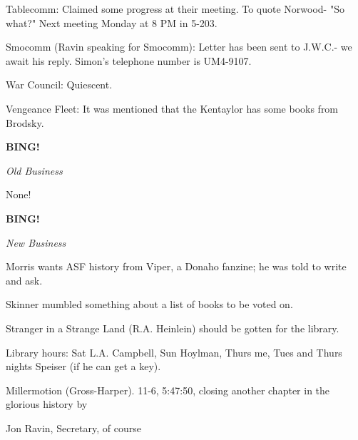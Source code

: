 \documentclass[12pt]{article}
\newcommand{\bing}{{\bf BING!} }
\newcommand{\goto}[1]{\bing \vskip 12pt \centerline{{\em{#1}}}}
\begin{document}
Tablecomm: Claimed some progress at their meeting. To quote Norwood- "So what?" Next meeting Monday at 8 PM in 5-203.

Smocomm (Ravin speaking for Smocomm): Letter has been sent to J.W.C.- we await his reply. Simon's telephone number is UM4-9107.

War Council: Quiescent.

Vengeance Fleet: It was mentioned that the Kentaylor has some books from Brodsky.

\goto{Old Business}

None!

\goto{New Business}

Morris wants ASF history from Viper, a Donaho fanzine; he was told to write and ask.

Skinner mumbled something about a list of books to be voted on.

Stranger in a Strange Land (R.A. Heinlein) should be gotten for the library.

Library hours: Sat L.A. Campbell, Sun Hoylman, Thurs me, Tues and Thurs nights Speiser (if he can get a key).

Millermotion (Gross-Harper). 11-6, 5:47:50, closing another chapter in the glorious history by

\vspace{12pt}

\centerline{Jon Ravin, Secretary, of course}
\end{document}

